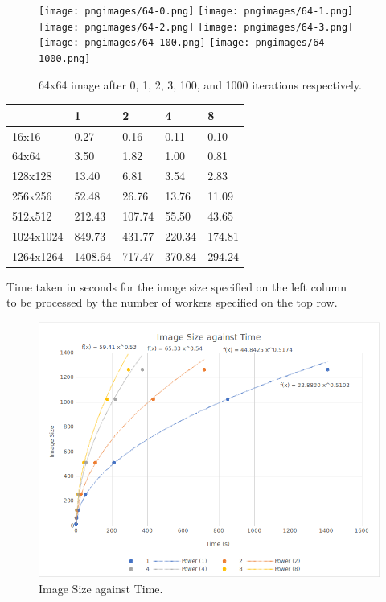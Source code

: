 \documentclass{article}
\begin{document}
\begin{figure}[H]
\centering
\texttt{[image: pngimages/64-0.png]}
\texttt{[image: pngimages/64-1.png]}
\texttt{[image: pngimages/64-2.png]}
\texttt{[image: pngimages/64-3.png]}
\texttt{[image: pngimages/64-100.png]}
\texttt{[image: pngimages/64-1000.png]}
\caption{64x64 image after 0, 1, 2, 3, 100, and 1000 iterations respectively.}
\end{figure}

\begin{center}
\begin{tabular}{ | l | l | l | l | l |}
\hline
   & 1 & 2 & 4 & 8 \\ \hline
16x16 & 0.27 & 0.16 & 0.11 & 0.10 \\ \hline
64x64 & 3.50 & 1.82 & 1.00 & 0.81 \\ \hline
128x128 & 13.40 & 6.81 & 3.54 & 2.83 \\ \hline
256x256 & 52.48 & 26.76 & 13.76 & 11.09 \\ \hline
512x512 & 212.43 & 107.74 & 55.50 & 43.65 \\ \hline
1024x1024 & 849.73 & 431.77 & 220.34 & 174.81 \\ \hline
1264x1264 & 1408.64 & 717.47 & 370.84 & 294.24 \\ \hline
\end{tabular}

\vspace{5mm}

Time taken in seconds for the image size specified on the left column \\
to be processed by the number of workers specified on the top row.

\end{center}

\newpage

\begin{figure}[H]
\centering
\includegraphics[width=15cm]{ImgvsTime(BeforePow).png}
\caption{Image Size against Time.}
\end{figure}
\end{document}

